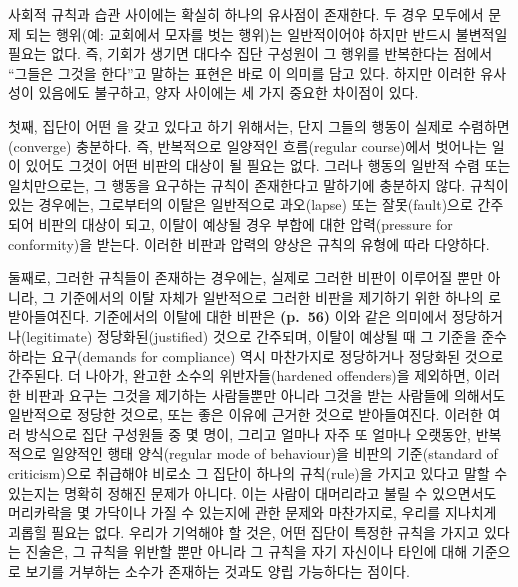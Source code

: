 사회적 규칙과 습관 사이에는 확실히 하나의 유사점이 존재한다. 두 경우
모두에서 문제 되는 행위(예: 교회에서 모자를 벗는 행위)는 일반적이어야
하지만 반드시 불변적일 필요는 없다. 즉, 기회가 생기면 대다수 집단
구성원이 그 행위를 반복한다는 점에서 “그들은 그것을  한다”고 말하는 표현은 바로 이 의미를 담고 있다. 하지만 이러한
유사성이 있음에도 불구하고, 양자 사이에는 세 가지 중요한 차이점이 있다.

첫째, 집단이 어떤 을 갖고 있다고 하기 위해서는, 단지
그들의 행동이 실제로 수렴하면(converge) 충분하다. 즉, 반복적으로
일양적인 흐름(regular course)에서 벗어나는 일이 있어도 그것이 어떤
비판의 대상이 될 필요는 없다. 그러나 행동의 일반적 수렴 또는
일치만으로는, 그 행동을 요구하는 규칙이 존재한다고 말하기에 충분하지
않다. 규칙이 있는 경우에는, 그로부터의 이탈은 일반적으로 과오(lapse)
또는 잘못(fault)으로 간주되어 비판의 대상이 되고, 이탈이 예상될 경우
부합에 대한 압력(pressure for conformity)을 받는다. 이러한 비판과 압력의
양상은 규칙의 유형에 따라 다양하다.

둘째로, 그러한 규칙들이 존재하는 경우에는, 실제로 그러한 비판이 이루어질
뿐만 아니라, 그 기준에서의 이탈 자체가 일반적으로 그러한 비판을 제기하기
위한 하나의 로 받아들여진다. 기준에서의
이탈에 대한 비판은 \textbf{(p.~56)} 이와 같은 의미에서
정당하거나(legitimate) 정당화된(justified) 것으로 간주되며, 이탈이
예상될 때 그 기준을 준수하라는 요구(demands for compliance) 역시
마찬가지로 정당하거나 정당화된 것으로 간주된다. 더 나아가, 완고한 소수의
위반자들(hardened offenders)을 제외하면, 이러한 비판과 요구는 그것을
제기하는 사람들뿐만 아니라 그것을 받는 사람들에 의해서도 일반적으로
정당한 것으로, 또는 좋은 이유에 근거한 것으로 받아들여진다. 이러한 여러
방식으로 집단 구성원들 중 몇 명이, 그리고 얼마나 자주 또 얼마나
오랫동안, 반복적으로 일양적인 행태 양식(regular mode of behaviour)을
비판의 기준(standard of criticism)으로 취급해야 비로소 그 집단이 하나의
규칙(rule)을 가지고 있다고 말할 수 있는지는 명확히 정해진 문제가 아니다.
이는 사람이 대머리라고 불릴 수 있으면서도 머리카락을 몇 가닥이나 가질 수
있는지에 관한 문제와 마찬가지로, 우리를 지나치게 괴롭힐 필요는 없다.
우리가 기억해야 할 것은, 어떤 집단이 특정한 규칙을 가지고 있다는 진술은,
그 규칙을 위반할 뿐만 아니라 그 규칙을 자기 자신이나 타인에 대해
기준으로 보기를 거부하는 소수가 존재하는 것과도 양립 가능하다는 점이다.

